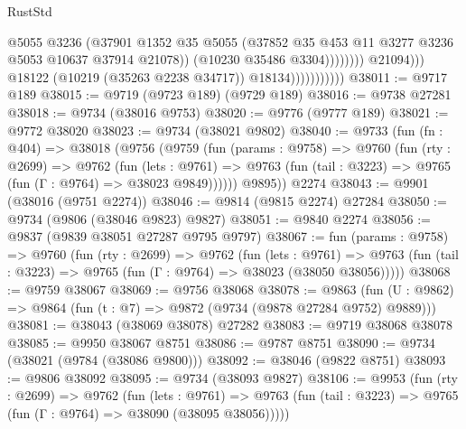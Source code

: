 \begin{lexlean}{RustStd}
\begin{coremodule}
                                              @5055
                                              @3236
                                              (@37901
                                                @1352
                                                @35
                                                @5055
                                                (@37852
                                                  @35
                                                  @453
                                                  @11
                                                  @3277
                                                  @3236
                                                  @5053
                                                  @10637
                                                  @37914
                                                  @21078))
                                              (@10230 @35486 @3304))))))))
                                @21094)))
                          @18122
                          (@10219 (@35263 @2238 @34717))
                          @18134)))))))))))
@38011 := @9717 @189
@38015 := @9719 (@9723 @189) (@9729 @189)
@38016 := @9738 @27281
@38018 := @9734 (@38016 @9753)
@38020 := @9776 (@9777 @189)
@38021 := @9772 @38020
@38023 := @9734 (@38021 @9802)
@38040 := @9733
    (fun (fn : @404) =>
    @38018
      (@9756
        (@9759
          (fun (params : @9758) =>
          @9760
            (fun (rty : @2699) =>
            @9762
              (fun (lets : @9761) =>
              @9763 (fun (tail : @3223) => @9765 (fun (Γ : @9764) => @38023 @9849))))))
        @9895))
    @2274
@38043 := @9901 (@38016 (@9751 @2274))
@38046 := @9814 (@9815 @2274) @27284
@38050 := @9734 (@9806 (@38046 @9823) @9827)
@38051 := @9840 @2274
@38056 := @9837 (@9839 @38051 @27287 @9795 @9797)
@38067 := fun (params : @9758) =>
  @9760
    (fun (rty : @2699) =>
    @9762
      (fun (lets : @9761) =>
      @9763 (fun (tail : @3223) => @9765 (fun (Γ : @9764) => @38023 (@38050 @38056)))))
@38068 := @9759 @38067
@38069 := @9756 @38068
@38078 := @9863
    (fun (U : @9862) => @9864 (fun (t : @7) => @9872 (@9734 (@9878 @27284 @9752) @9889)))
@38081 := @38043 (@38069 @38078) @27282
@38083 := @9719 @38068 @38078
@38085 := @9950 @38067 @8751
@38086 := @9787 @8751
@38090 := @9734 (@38021 (@9784 (@38086 @9800)))
@38092 := @38046 (@9822 @8751)
@38093 := @9806 @38092
@38095 := @9734 (@38093 @9827)
@38106 := @9953
    (fun (rty : @2699) =>
    @9762
      (fun (lets : @9761) =>
      @9763 (fun (tail : @3223) => @9765 (fun (Γ : @9764) => @38090 (@38095 @38056)))))

\end{coremodule}
\end{lexlean}
